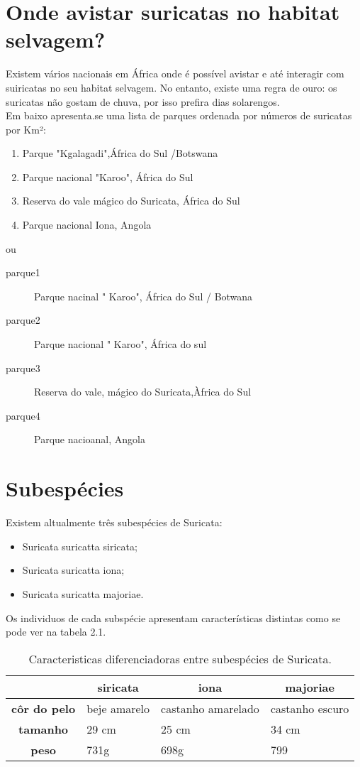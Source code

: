 \documentclass[a4paper,11pt]{report}
\begin{document}
\section{Onde avistar  suricatas no habitat selvagem?}

Existem vários nacionais em África onde é possível avistar e até interagir com suiricatas no seu habitat selvagem. No entanto, existe uma regra de ouro: os suricatas não gostam de chuva, por isso prefira dias solarengos.
\\  Em baixo apresenta.se uma lista de parques ordenada por números de suricatas por Km²:
\begin{enumerate}
\item Parque "Kgalagadi",África do Sul /Botswana
\item Parque nacional "Karoo", África do Sul
\item Reserva do vale mágico do Suricata, África do Sul
\item Parque nacional Iona, Angola
\end{enumerate}
ou

\begin{description}
\item[parque1] Parque nacinal " Karoo", África do Sul / Botwana
\item[parque2] Parque nacional " Karoo", África do sul
\item[parque3] Reserva do vale, mágico do Suricata,Àfrica do Sul
\item[parque4] Parque nacioanal, Angola
\end{description}
\section{Subespécies}
Existem altualmente três subespécies de Suricata:
\begin{itemize}
\item Suricata suricatta siricata;
\item Suricata suricatta iona;
\item Suricata suricatta majoriae.

\end{itemize}
\newpage
Os individuos de cada subspécie apresentam características distintas   como se pode ver na tabela 2.1.

\begin{table}[h!] 
\begin{tabular}{|c|l|l|l|}
\hline
\rowcolor{gray!40}
\multicolumn{1}{c|}{} &
\multicolumn{1}{c|}{\textbf{siricata}} &
\multicolumn{1}{c|}{\textbf{iona}} &
\multicolumn{1}{c}{\textbf{majoriae}}\\ \hline
\textbf{côr do pelo} & beje amarelo & castanho amarelado & castanho escuro\\ \hline
\textbf{tamanho} & 29 cm & 25 cm &  34 cm \\ \hline
\textbf{peso} & 731g & 698g & 799 \\ \hline

\end{tabular}
\caption{Caracteristicas diferenciadoras entre subespécies de Suricata.}

\end{table}
\end{document}
